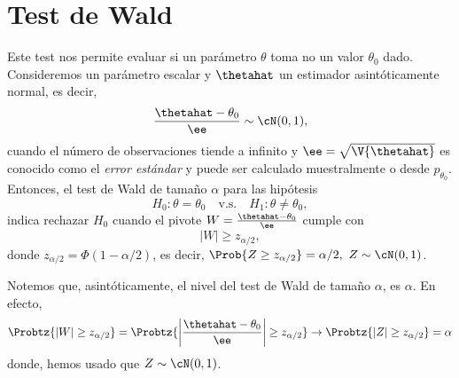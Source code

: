 \section{Test de Wald} 
\label{sub:test_de_wald}

Este test nos permite evaluar si un parámetro $\theta$ toma no un valor $\theta_0$ dado. Consideremos un parámetro escalar y $\thetahat$ un estimador asintóticamente normal, es decir, 
\begin{equation}
	\frac{\thetahat - \theta_0}{\ee} \sim \cN(0,1),
\end{equation}
cuando el número de observaciones tiende a infinito y $\ee=\sqrt{\V{\thetahat}}$ es conocido como el \emph{error estándar} y puede ser calculado muestralmente o desde $p_{\theta_0}$. Entonces, el test de Wald de tamaño $\alpha$ para las hipótesis 
	\begin{equation}
		H_0:\theta =\theta_0\quad \text{v.s.}\quad H_1:\theta \neq \theta_0,
	\end{equation}
indica rechazar $H_0$ cuando el pivote $W=\frac{\thetahat - \theta_0}{\ee}$ cumple con 
\begin{equation}
	|W|\geq z_{\alpha/2},
\end{equation}
donde $z_{\alpha/2}=\Phi(1-\alpha/2)$, es decir, $\Prob{Z\geq z_{\alpha/2}}=\alpha/2,\ Z\sim\cN(0,1)$. 

\begin{remark}
	Notemos que, asintóticamente, el nivel del test de Wald de tamaño  $\alpha$, es $\alpha$. En efecto, 
\begin{equation}
	\Probtz{|W|\geq z_{\alpha/2}} = \Probtz{\left|\frac{\thetahat - \theta_0}{\ee}\right|\geq z_{\alpha/2}} \rightarrow  \Probtz{|Z|\geq z_{\alpha/2}} = \alpha
\end{equation}
donde, hemos usado que $Z\sim\cN(0,1)$.
\end{remark}


